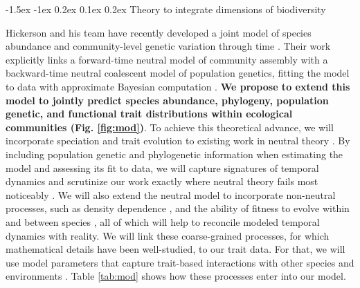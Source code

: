\documentclass[11pt]{article}
\makeatletter
\renewcommand\subsubsection{\@startsection{subsection}{1}{\z@}%
                                  {-1.5ex \@plus -1ex \@minus 0.2ex}%
                                  {0.1ex \@plus 0.2ex}%
                                  {\normalfont\bfseries}}
\makeatother
\begin{document}
\subsubsection{Theory to integrate dimensions of
biodiversity}\label{theory-to-integrate-dimensions-of-biodiversity}

Hickerson and his team have recently developed a joint model of
species abundance and community-level genetic variation through time
\cite{Overcast_undated-op}. Their work explicitly links a forward-time
neutral model of community assembly with a backward-time neutral
coalescent model of population genetics, fitting the model to data
with approximate Bayesian computation \citep[ABC;][]{Beaumont2010-si}.
\textbf{We propose to extend this model to jointly predict species
  abundance, phylogeny, population genetic, and functional trait
  distributions within ecological communities (Fig.
  \ref{fig:mod})}. To achieve this theoretical advance, we will
incorporate speciation \cite{Rosindell2010-gq} and trait evolution to
existing work in neutral theory \cite{Rosindell2011-od,
  Etienne2007-we}.  By including population genetic and phylogenetic
information when estimating the model and assessing its fit to data,
we will capture signatures of temporal dynamics and scrutinize our
work exactly where neutral theory fails most noticeably
\cite{Ricklefs2006-tn}. We will also extend the neutral model to
incorporate non-neutral processes, such as density dependence
\cite{Haegeman2017-kf}, and the ability of fitness to evolve within
and between species \cite{Rosindell2015-gp}, all of which will help to
reconcile modeled temporal dynamics with reality. We will link these
coarse-grained processes, for which mathematical details have been
well-studied, to our trait data. For that, we will use model
parameters that capture trait-based interactions with other species
\cite{Grilli2017-ot, HilleRisLambers2012-xt} and environments
\cite{Adler2010-ad, Jabot2008-ms, Tuomisto2003-kf}. Table
\ref{tab:mod} shows how these processes enter into our model.
\end{document}
